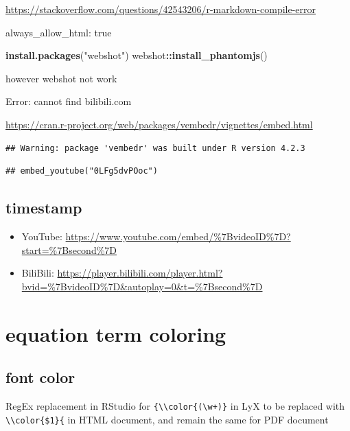 \documentclass[
]{book}
\newenvironment{Shaded}{\begin{snugshade}}{\end{snugshade}}
\newcommand{\FunctionTok}[1]{\textcolor[rgb]{0.13,0.29,0.53}{\textbf{#1}}}
\newcommand{\NormalTok}[1]{#1}
\newcommand{\SpecialCharTok}[1]{\textcolor[rgb]{0.81,0.36,0.00}{\textbf{#1}}}
\newcommand{\StringTok}[1]{\textcolor[rgb]{0.31,0.60,0.02}{#1}}
\providecommand{\tightlist}{%
  \setlength{\itemsep}{0pt}\setlength{\parskip}{0pt}}
\theoremstyle{definition}
\theoremstyle{definition}
\theoremstyle{definition}
\theoremstyle{definition}
\theoremstyle{remark}
\begin{document}
\url{https://stackoverflow.com/questions/42543206/r-markdown-compile-error}

always\_allow\_html: true

\begin{Shaded}
\begin{Highlighting}[]
\FunctionTok{install.packages}\NormalTok{(}\StringTok{"webshot"}\NormalTok{)}
\NormalTok{webshot}\SpecialCharTok{::}\FunctionTok{install\_phantomjs}\NormalTok{()}
\end{Highlighting}
\end{Shaded}

however webshot not work

Error: cannot find bilibili.com

\url{https://cran.r-project.org/web/packages/vembedr/vignettes/embed.html}

\begin{verbatim}
## Warning: package 'vembedr' was built under R version 4.2.3
\end{verbatim}

\begin{verbatim}
## embed_youtube("0LFg5dvPOoc")
\end{verbatim}

\subsection{timestamp}\label{timestamp}

\begin{itemize}
\tightlist
\item
  YouTube: \url{https://www.youtube.com/embed/\%7BvideoID\%7D?start=\%7Bsecond\%7D}
\item
  BiliBili: \url{https://player.bilibili.com/player.html?bvid=\%7BvideoID\%7D&autoplay=0&t=\%7Bsecond\%7D}
\end{itemize}

\section{equation term coloring}\label{equation-term-coloring}

\subsection{font color}\label{font-color}

RegEx replacement in RStudio for \texttt{\{\textbackslash{}\textbackslash{}color\{(\textbackslash{}w+)\}} in LyX to be replaced with \texttt{\textbackslash{}\textbackslash{}color\{\$1\}\{} in HTML document, and remain the same for PDF document
\end{document}
